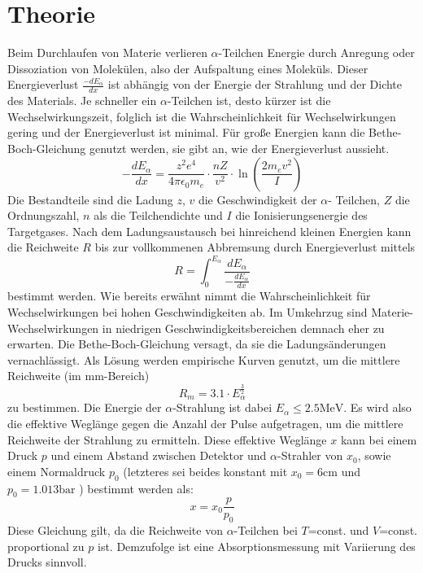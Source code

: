\section{Theorie}
\label{sec:Theorie}

Beim Durchlaufen von Materie verlieren $\alpha$-Teilchen Energie durch Anregung 
oder Dissoziation von Molekülen, also der Aufspaltung eines Moleküls. Dieser 
Energieverlust $\frac{-dE_{\alpha}}{dx}$ ist abhängig von der Energie der 
Strahlung und der Dichte des Materials. Je schneller ein $\alpha$-Teilchen ist, 
desto kürzer ist die Wechselwirkungszeit, folglich ist die Wahrscheinlichkeit 
für Wechselwirkungen gering und der Energieverlust ist minimal. Für große 
Energien kann die Bethe-Boch-Gleichung genutzt werden, sie gibt an, wie der 
Energieverlust aussieht.
\begin{equation}
    \label{eqn:1}
    -\frac{dE_\alpha}{dx} = \frac{z^2 e^4}{4 \pi \epsilon_0 m_e} \cdot 
                           \frac{n Z}{v^2} \cdot \ln\left(\frac{2 m_e v^2}{I}\right)
\end{equation}
Die Bestandteile sind die Ladung $z$, $v$ die Geschwindigkeit der $\alpha$-
Teilchen, $Z$ die Ordnungszahl, $n$ als die Teilchendichte und $I$ die 
Ionisierungsenergie des Targetgases. Nach dem Ladungsaustausch bei hinreichend
kleinen Energien kann die Reichweite $R$ bis zur vollkommenen Abbremsung durch 
Energieverlust mittels 
\begin{equation}
    \label{eqn:2}
    R = \int_0^{E_\alpha} \frac{dE_{\alpha}}{-\frac{dE_\alpha}{dx}}
\end{equation}
bestimmt werden. Wie bereits erwähnt nimmt die Wahrscheinlichkeit für 
Wechselwirkungen bei hohen Geschwindigkeiten ab. Im Umkehrzug sind Materie-
Wechselwirkungen in niedrigen Geschwindigkeitsbereichen demnach eher zu erwarten.
Die Bethe-Boch-Gleichung versagt, da sie die Ladungsänderungen vernachlässigt.
Als Lösung werden empirische Kurven genutzt, um die mittlere Reichweite (im 
$\unit{\milli\meter}$-Bereich)
\begin{equation}
    \label{eqn:3}
    R_m = 3.1 \cdot E_{\alpha}^{\frac{3}{2}}
\end{equation}
zu bestimmen. Die Energie der $\alpha$-Strahlung ist dabei $E_{\alpha} \leq 
2.5 \unit{\mega\eV}$. Es wird also die effektive Weglänge gegen die Anzahl der 
Pulse aufgetragen, um die mittlere Reichweite der Strahlung zu ermitteln.
Diese effektive Weglänge $x$ kann bei einem Druck $p$ und einem Abstand zwischen 
Detektor und $\alpha$-Strahler von $x_0$, sowie einem Normaldruck $p_0$ (letzteres 
sei beides konstant mit $x_0 = 6 \unit{\centi\meter}$ und $p_0 = 1.013 \unit{\bar}$
\cite{normaldruck}) bestimmt werden als:
\begin{equation}
    \label{eqn:4}
    x = x_0 \frac{p}{p_0}
\end{equation}
Diese Gleichung gilt, da die Reichweite von $\alpha$-Teilchen bei $T$=const. und 
$V$=const. proportional zu $p$ ist. Demzufolge ist eine Absorptionsmessung mit 
Variierung des Drucks sinnvoll.
\cite{anleitung11}


